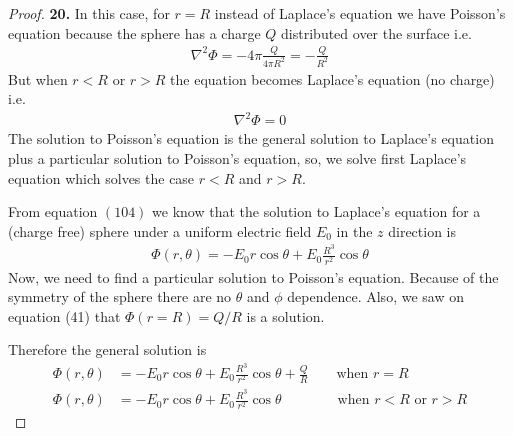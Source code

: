\documentclass[11pt]{article}
\theoremstyle{definition}
\begin{document}
\cleardoublepage
\begin{proof}{\textbf{20.}}
In this case, for $r = R$ instead of Laplace's equation we have Poisson's
equation because the sphere has a charge $Q$ distributed over the surface i.e.
\begin{align*}
    \nabla^2 \Phi = -4\pi\frac{Q}{4\pi R^2} = -\frac{Q}{R^2}
\end{align*}
But when $r < R$ or $r > R$ the equation becomes Laplace's equation (no charge)
i.e.
\begin{align*}
    \nabla^2 \Phi = 0
\end{align*}
The solution to Poisson's equation is the general solution to Laplace's
equation plus a particular solution to Poisson's equation, so, we solve first
Laplace's equation which solves the case $r < R$ and $r > R$.

From equation $(104)$ we know that the solution to Laplace's equation
for a (charge free) sphere under a uniform electric field $E_0$ in the $z$
direction is
\begin{align*}
    \Phi(r, \theta) = -E_0r \cos\theta + E_0\frac{R^3}{r^2}\cos\theta
\end{align*}
Now, we need to find a particular solution to Poisson's equation.
Because of the symmetry of the sphere there are no $\theta$ and $\phi$
dependence. Also, we saw on equation (41) that $\Phi(r=R) = Q/R$ is a solution.

Therefore the general solution is 
\begin{align*}
    \Phi(r, \theta) &= -E_0r \cos\theta + E_0\frac{R^3}{r^2}\cos\theta + \frac{Q}{R}
    \qquad \text{when } r = R\\
    \Phi(r, \theta) &= -E_0r \cos\theta + E_0\frac{R^3}{r^2}\cos\theta
    \qquad\qquad \text{when }r < R \text{ or }r>R
\end{align*}

\end{proof}
\end{document}
